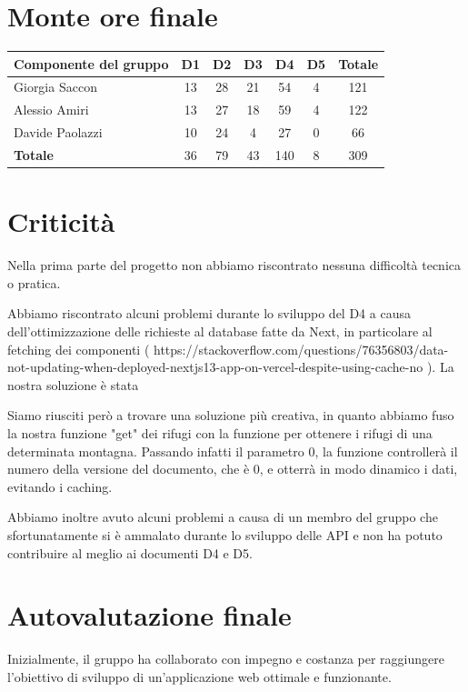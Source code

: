 \documentclass[a4paper,12pt]{article}
\begin{document}
\newpage
\section{Monte ore finale}
\begin{center}
\begin{tabular}{|l|c|c|c|c|c|c|}
\hline
\textbf{Componente del gruppo}     &\textbf{D1}       &\textbf{D2}    &\textbf{D3}   &\textbf{D4}    &\textbf{D5}    &\textbf{Totale}      \\ \hline
Giorgia Saccon          & 13  & 28 & 21 &  54 &  4 & 121 \\ \hline 
Alessio Amiri           & 13  & 27 & 18 &  59 &  4 & 122 \\ \hline 
Davide Paolazzi         & 10  & 24 & 4  &  27 &  0 & 66  \\ \hline 
\textbf{Totale}         & 36  & 79 & 43 & 140 & 8 & 309  \\ \hline 
\end{tabular}
\end{center}

\section{Criticità}
Nella prima parte del progetto non abbiamo riscontrato nessuna difficoltà tecnica o pratica.  

Abbiamo riscontrato alcuni problemi durante lo sviluppo del D4  a causa dell'ottimizzazione delle richieste al database fatte da Next, in particolare al fetching dei componenti ( https://stackoverflow.com/questions/76356803/data-not-updating-when-deployed-nextjs13-app-on-vercel-despite-using-cache-no ).
La nostra soluzione è stata 

Siamo riusciti però a trovare una soluzione più creativa, in quanto abbiamo fuso la nostra funzione "get" dei rifugi con la funzione per ottenere i rifugi di una determinata montagna. \newline Passando infatti il parametro 0, la funzione controllerà il numero della versione del documento, che è 0, e otterrà in modo dinamico i dati, evitando i caching. 

Abbiamo inoltre avuto alcuni problemi a causa di un membro del gruppo che sfortunatamente si è ammalato durante lo sviluppo delle API e non ha potuto contribuire al meglio ai documenti D4 e D5.

\section{Autovalutazione finale}
Inizialmente, il gruppo ha collaborato con impegno e costanza per raggiungere l'obiettivo di sviluppo di un'applicazione web ottimale e funzionante.
\end{document}

